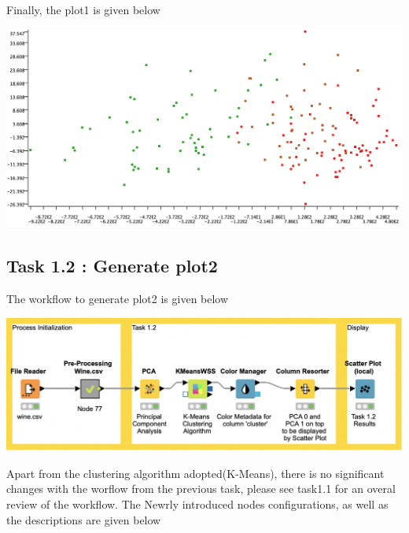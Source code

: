 \documentclass[11pt]{article}
\begin{document}
			\fi
			Finally, the plot1 is given below
			\iftrue
			\begin{center}
				\includegraphics[scale=0.5]{res/t1/t11/t11-plot1}
			\end{center}
			\fi
		\subsection*{Task 1.2 : Generate plot2}
			The workflow to generate plot2 is given below
			\iftrue
			\begin{center}
				\includegraphics[scale=0.35]{res/t1/t12/t12-workflow}
			\end{center}
			\fi
			Apart from the clustering algorithm adopted(K-Means), there is no significant changes with the worflow from the previous task, please see task1.1 for an overal review of the workflow. The Newrly introduced nodes configurations, as well as the descriptions are given below
			
\end{document}
